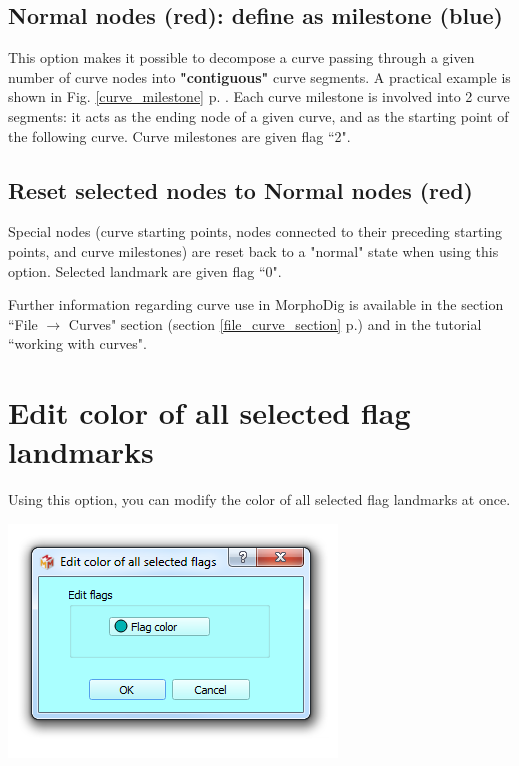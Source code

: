 \subsection{Normal nodes (red): define as milestone (blue)}\label{section_curve_segment2}
This option makes it possible to decompose a curve passing through a given number of curve nodes into \textbf{"contiguous"} curve segments. A practical example is shown in Fig. \ref{curve_milestone} p. \pageref{curve_milestone}. Each curve milestone is involved into 2 curve segments: it acts as the ending node of a given curve, and as the starting point of the following curve. Curve milestones are given flag ``2".




\subsection{Reset selected nodes to Normal nodes (red)}
Special nodes (curve starting points, nodes connected to their preceding starting points, and curve milestones) are reset back to a "normal" state when using this option. Selected landmark are given flag ``0".

\noindent Further information regarding curve use in MorphoDig is available in the section ``File $\rightarrow$
Curves" section (section \ref{file_curve_section} p.\pageref{file_curve_section}) and in the tutorial ``working with curves".

\section{Edit color of all selected flag landmarks}
\noindent
\begin{minipage}{0.5\textwidth}
Using this option, you can modify the color of all selected flag landmarks at once.
\end{minipage}    
\begin{minipage}{0.5\textwidth}\centering
  \includegraphics[scale=0.5]{images/10/edit_color_all_selected_flags.png}
 \end{minipage} 


